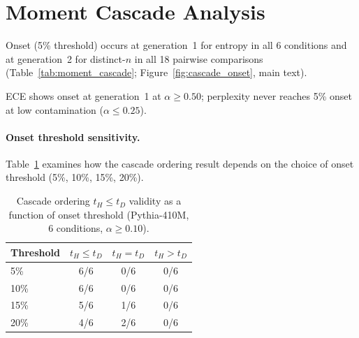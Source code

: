 \section{Moment Cascade Analysis}
\label{app:moment_cascade}

Onset (5\% threshold) occurs at generation~1 for entropy in all 6 conditions and at generation~2 for distinct-$n$ in all 18 pairwise comparisons (Table~\ref{tab:moment_cascade}; Figure~\ref{fig:cascade_onset}, main text).

\begin{table}[t]
\centering
\small
\caption{Degradation onset generation (5\% threshold) by metric and condition (Pythia-410M, WikiText, fp32). Token entropy reaches onset at generation~1 in all non-null conditions; distinct-$n$ metrics follow at generation~2.}
\label{tab:moment_cascade}
\end{table}


ECE shows onset at generation~1 at $\alpha{\geq}0.50$; perplexity never reaches 5\% onset at low contamination ($\alpha{\leq}0.25$).

\paragraph{Onset threshold sensitivity.}
Table~\ref{tab:onset_threshold_sensitivity} examines how the cascade ordering result depends on the choice of onset threshold (5\%, 10\%, 15\%, 20\%).

\begin{table}[t]
\centering
\small
\caption{Cascade ordering $t_H \leq t_D$ validity as a function of onset threshold (Pythia-410M, 6 conditions, $\alpha{\geq}0.10$).}
\label{tab:onset_threshold_sensitivity}
\begin{tabular}{lccc}
\toprule
Threshold & $t_H \leq t_D$ & $t_H = t_D$ & $t_H > t_D$ \\
\midrule
5\% & 6/6 & 0/6 & 0/6 \\
10\% & 6/6 & 0/6 & 0/6 \\
15\% & 5/6 & 1/6 & 0/6 \\
20\% & 4/6 & 2/6 & 0/6 \\
\bottomrule
\end{tabular}
\end{table}

